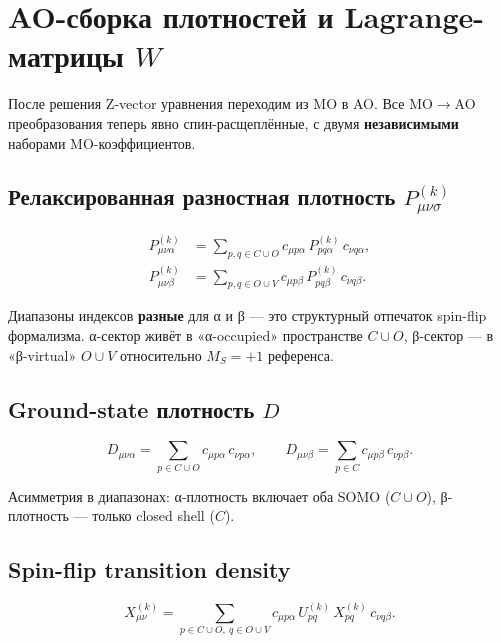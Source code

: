 \documentclass[11pt, a4paper]{article}
\theoremstyle{definition}
\begin{document}
\section{AO-сборка плотностей и Lagrange-матрицы $W$}
\label{sec:AOassembly}

После решения Z-vector уравнения переходим из MO в AO. Все MO$\to$AO преобразования теперь явно спин-расщеплённые, с двумя \textbf{независимыми} наборами MO-коэффициентов.

\subsection{Релаксированная разностная плотность $P^{(k)}_{\mu\nu\sigma}$}

\begin{align}
    P^{(k)}_{\mu\nu\alpha} &= \sum_{p, q \in C \cup O} c_{\mu p \alpha}\, P^{(k)}_{pq\alpha}\, c_{\nu q \alpha}, \\
    P^{(k)}_{\mu\nu\beta} &= \sum_{p, q \in O \cup V} c_{\mu p \beta}\, P^{(k)}_{pq\beta}\, c_{\nu q \beta}.
\end{align}

Диапазоны индексов \textbf{разные} для α и β --- это структурный отпечаток spin-flip формализма. α-сектор живёт в «α-occupied» пространстве $C \cup O$, β-сектор --- в «β-virtual» $O \cup V$ относительно $M_S = +1$ референса.

\subsection{Ground-state плотность $D$}

\begin{equation}
    D_{\mu\nu\alpha} = \sum_{p \in C \cup O} c_{\mu p \alpha}\, c_{\nu p \alpha}, \qquad
    D_{\mu\nu\beta} = \sum_{p \in C} c_{\mu p \beta}\, c_{\nu p \beta}.
\end{equation}

Асимметрия в диапазонах: α-плотность включает оба SOMO ($C \cup O$), β-плотность --- только closed shell ($C$).

\subsection{Spin-flip transition density}

\begin{equation}
    X^{(k)}_{\mu\nu} = \sum_{p \in C \cup O,\ q \in O \cup V} c_{\mu p \alpha}\, U^{(k)}_{pq}\, X^{(k)}_{pq}\, c_{\nu q \beta}.
    \label{eq:Xmunu}
\end{equation}
\end{document}
